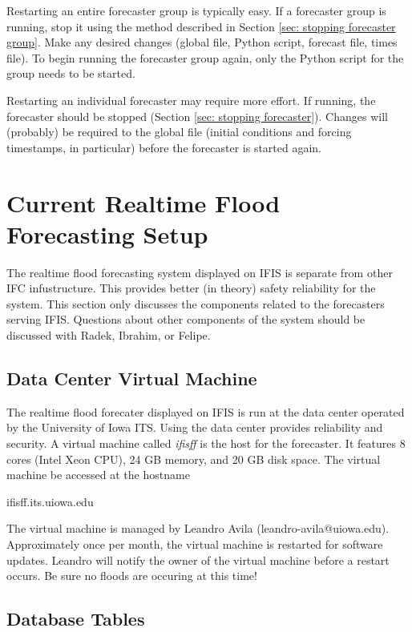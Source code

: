\documentclass[12pt]{article}
\begin{document}
Restarting an entire forecaster group is typically easy. If a forecaster group is running, stop it using the method described in Section \ref{sec: stopping forecaster group}. Make any desired changes (global file, Python script, forecast file, times file). To begin running the forecaster group again, only the Python script for the group needs to be started.

Restarting an individual forecaster may require more effort. If running, the forecaster should be stopped (Section \ref{sec: stopping forecaster}). Changes will (probably) be required to the global file (initial conditions and forcing timestamps, in particular) before the forecaster is started again.

\section{Current Realtime Flood Forecasting Setup} \label{sec: current realtime flood forecasting setup}

The realtime flood forecasting system displayed on IFIS is separate from other IFC infustructure. This provides better (in theory) safety reliability for the system. This section only discusses the components related to the forecasters serving IFIS. Questions about other components of the system should be discussed with Radek, Ibrahim, or Felipe.

\subsection{Data Center Virtual Machine} \label{sec: data center}

The realtime flood forecater displayed on IFIS is run at the data center operated by the University of Iowa ITS. Using the data center provides reliability and security. A virtual machine called \emph{ifisff} is the host for the forecaster. It features 8 cores (Intel Xeon CPU), 24 GB memory, and 20 GB disk space. The virtual machine be accessed at the hostname
\begin{center}
 ifisff.its.uiowa.edu
\end{center}
The virtual machine is managed by Leandro Avila (leandro-avila@uiowa.edu). Approximately once per month, the virtual machine is restarted for software updates. Leandro will notify the owner of the virtual machine before a restart occurs. Be sure no floods are occuring at this time!

\subsection{Database Tables} \label{sec: database tables}
\end{document}
